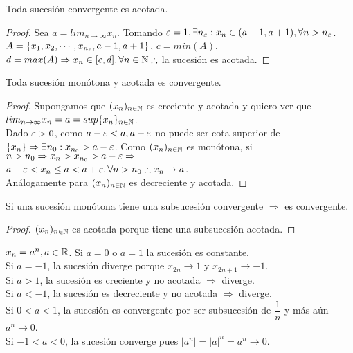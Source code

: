 \begin{theorem}
  Toda sucesión convergente es acotada.
  \begin{proof}
    Sea $a = lim_{n \to \infty} x_n$. Tomando $\varepsilon = 1, \exists n_{\varepsilon} : x_n \in (a - 1, a+1), \forall n > n_{\varepsilon}$. \\
    $A = \{ x_1, x_2, \cdots, x_{n_{\varepsilon}}, a-1, a+1 \}$, $c = min(A)$, $d = max(A) \Rightarrow x_n \in [c, d], \forall n \in \mathbb{N} \therefore $ la sucesión es acotada.
  \end{proof}
\end{theorem}

\begin{theorem}
  Toda sucesión monótona y acotada es convergente.
  \begin{proof}
    Supongamos que $(x_n)_{n \in \mathbb{N}}$ es creciente y acotada y quiero ver que $lim_{n \to \infty} x_n = a = sup\{x_n\}_{n \in \mathbb{N}}$. \\
    Dado $\varepsilon > 0$, como $a-\varepsilon < a, a-\varepsilon$ no puede ser cota superior de $\{x_n\} \Rightarrow \exists n_0 : x_{n_0} > a - \varepsilon$.
    Como $(x_n)_{n \in \mathbb{N}}$ es monótona, si $n > n_0 \Rightarrow x_n > x_{n_0} > a - \varepsilon \Rightarrow$ \\
    $a-\varepsilon < x_n \leq a < a+\varepsilon, \forall n > n_0 \therefore x_n \to a$. \\
    Análogamente para $(x_n)_{n \in \mathbb{N}}$ es decreciente y acotada.
  \end{proof}
\end{theorem}

\begin{corollary}
  Si una sucesión monótona tiene una subsucesión convergente $\Rightarrow$ es convergente.
  \begin{proof}
    $(x_n)_{n \in \mathbb{N}}$ es acotada porque tiene una subsucesión acotada.
  \end{proof}
\end{corollary}

\begin{eg}
  $x_n = a^n, a \in \mathbb{R}$. Si $a=0$ o $a = 1$ la sucesión es constante. \\
  Si $a = -1$, la sucesión diverge porque $x_{2n} \to 1$ y $x_{2n+1} \to -1$. \\
  Si $a > 1$, la sucesión es creciente y no acotada $\Rightarrow$ diverge. \\
  Si $a < -1$, la sucesión es decreciente y no acotada $\Rightarrow$ diverge. \\
  Si $0 < a < 1$, la sucesión es convergente por ser subsucesión de $\dfrac{1}{n}$ y más aún $a^n \to 0$. \\
  Si $-1 < a < 0$, la sucesión converge pues $|a^n| = |a|^n = a^n \to 0$.
\end{eg}

